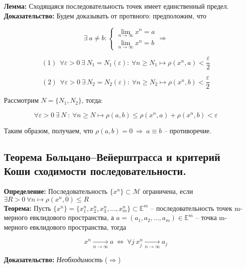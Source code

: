 \documentclass[a4paper,12pt]{article} %
\begin{document}
\noindent \textbf{Лемма:} Сходящаяся последовательность точек имеет единственный предел.\\

\noindent \textbf{Доказательство:} Будем доказывать от протвного: предположим, что

\begin{equation*}
    \exists ~ a \neq b : 
    \begin{cases}
        \lim_{n \to \infty} x^n = a\\
        \lim_{n \to \infty} x^n = b
    \end{cases}
    \Rightarrow
\end{equation*}

\[ (1) ~~ \forall \varepsilon > 0 ~ \exists ~ N_1 = N_1(\varepsilon) : ~ \forall n \geqslant N_1 \mapsto \rho(x^n, a) < \frac{\varepsilon}{2} \]

\[ (2) ~~ \forall \varepsilon > 0 ~ \exists ~ N_2 = N_2(\varepsilon) : ~ \forall n \geqslant N_2 \mapsto \rho(x^n, b) < \frac{\varepsilon}{2} \]

\noindent Рассмотрим $N = \{N_1, N_2\}$, тогда:

\[ \forall \varepsilon > 0 ~ \exists ~ N ~ : ~ \forall n \geqslant N \mapsto \rho(a, b) \leqslant \rho(x^n, a) + \rho(x^n, b) < \varepsilon \]

\noindent Таким образом, получаем, что $\rho(a, b) = 0 ~ \Rightarrow ~ a \equiv b$ -- противоречие.

\subsection*{Теорема Больцано–Вейерштрасса и критерий Коши сходимости последовательности.}

\noindent \textbf{Определение:} Последовательность $\{x^n \} \subset \mathscr{M}$ ограничена, если $\exists R > 0 ~ \forall n \mapsto \rho(x^n, 0) \leqslant R$\\

\noindent \textbf{Теорема:} Пусть $\{x^n \} = \{x_1^n, x_2^n, x_3^n, \dots, x_m^n\} \subset \mathbb{E}^m$ -- последовательность точек m-мерного евклидового пространства, а $a = (a_1, a_2, \dots, a_m) \in \mathbb{E}^m$ -- точка m-мерного евклидового пространства, тогда

\[ x^n \xrightarrow[n \to \infty]{} a ~ \Leftrightarrow ~ \forall j ~ x_j^n \xrightarrow[n \to \infty]{} a_j \]

\noindent \textbf{Доказательство:} \textit{Необходимость} ($\Rightarrow$)\\
\end{document}
